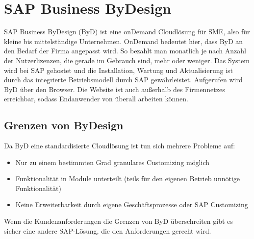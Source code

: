 \documentclass{handout}
\begin{document}
\section{SAP Business ByDesign}

SAP Business ByDesign (ByD) ist eine onDemand Cloudlösung für SME, also für kleine bis mittelständige Unternehmen. OnDemand bedeutet hier, dass ByD an den Bedarf der Firma angepasst wird. So bezahlt man monatlich je nach Anzahl der Nutzerlizenzen, die gerade im Gebrauch sind, mehr oder weniger. Das System wird bei SAP gehostet und die Installation, Wartung und Aktualisierung ist durch das integrierte Betriebsmodell durch SAP gewährleistet. Aufgerufen wird ByD über den Browser. Die Website ist auch außerhalb des Firmennetzes erreichbar, sodass Endanwender von überall arbeiten können.

\subsection{Grenzen von ByDesign}

Da ByD eine standardisierte Cloudlösung ist tun sich mehrere Probleme auf:

\begin{itemize}
\item Nur zu einem bestimmten Grad granulares Customizing möglich
\item Funktionalität in Module unterteilt (teils für den eigenen Betrieb unnötige Funktionalität)
\item Keine Erweiterbarkeit durch eigene Geschäftsprozesse oder SAP Customizing
\end{itemize}

Wenn die Kundenanforderungen die Grenzen von ByD überschreiten gibt es sicher eine andere SAP-Lösung, die den Anforderungen gerecht wird.


\newpage


\end{document}
